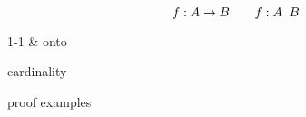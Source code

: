 

\begin{frame}{}
  \begin{definition}
    \[
      f: A \to B \qquad f: A \textcolor{red}{\;\;} B
    \]

    \vspace{0.50cm}
    \centerline{1-1 \& onto}
  \end{definition}
\end{frame}

\begin{frame}{}
  cardinality
\end{frame}

\begin{frame}{}
  proof examples
\end{frame}

\begin{frame}{}
\end{frame}
